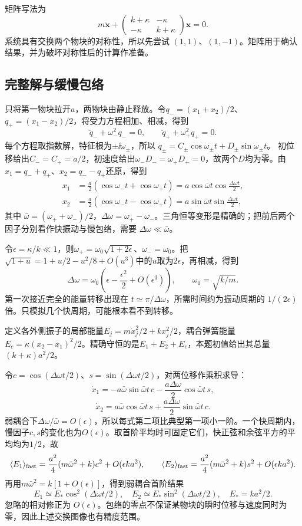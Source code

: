 \documentclass[11pt,openany,fontset=fandol]{ctexbook}
\theoremstyle{plain}\newtheorem{theorem}{定理}[chapter]\newtheorem{proposition}[theorem]{命题}
\theoremstyle{definition}\newtheorem{definition}{定义}[chapter]\newtheorem{example}{例}[chapter]
\theoremstyle{remark}\newtheorem*{remark}{说明}
\newcommand{\vct}[1]{\bm{#1}}\newcommand{\Rea}{\operatorname{Re}}\newcommand{\Ima}{\operatorname{Im}}
\begin{document}
矩阵写法为
\[
m\ddot{\vct x}+\begin{pmatrix}k+\kappa&-\kappa\\-\kappa&k+\kappa\end{pmatrix}\vct x=0.
\]
系统具有交换两个物块的对称性，所以先尝试 $(1,1)$、$(1,-1)$。矩阵用于确认结果，并为破坏对称性后的计算作准备。

\subsection{完整解与缓慢包络}
只将第一物块拉开$a$，两物块由静止释放。令$q_-=(x_1+x_2)/2$、$q_+=(x_1-x_2)/2$，将受力方程相加、相减，得到
\[\ddot q_-+\omega_-^2q_-=0,\qquad
\ddot q_++\omega_+^2q_+=0.\]
每个方程取指数解，特征根为$\pm\ii\omega_\pm$，所以
$q_\pm=C_\pm\cos\omega_\pm t+D_\pm\sin\omega_\pm t$。
初位移给出$C_-=C_+=a/2$，初速度给出$\omega_-D_-=\omega_+D_+=0$，故两个$D$均为零。由$x_1=q_-+q_+$、$x_2=q_--q_+$还原，得到
\begin{align}
x_1&=\frac a2(\cos\omega_-t+\cos\omega_+t)
=a\cos\bar\omega t\cos\frac{\Delta\omega t}{2},\\
x_2&=\frac a2(\cos\omega_-t-\cos\omega_+t)
=a\sin\bar\omega t\sin\frac{\Delta\omega t}{2},
\end{align}
其中 $\bar\omega=(\omega_++\omega_-)/2$，$\Delta\omega=\omega_+-\omega_-$。三角恒等变形是精确的；把前后两个因子分别看作快振动与慢包络，需要 $\Delta\omega\ll\bar\omega$。

令$\epsilon=\kappa/k\ll1$，则$\omega_+=\omega_0\sqrt{1+2\epsilon}$、$\omega_-=\omega_0$。把
$\sqrt{1+u}=1+u/2-u^2/8+O(u^3)$中的$u$取为$2\epsilon$，再相减，得到
\[
\Delta\omega=\omega_0\left(\epsilon-\frac{\epsilon^2}{2}+O(\epsilon^3)\right),\qquad\omega_0=\sqrt{k/m}.
\]
第一次接近完全的能量转移出现在 $t\simeq\pi/\Delta\omega$，所需时间约为振动周期的 $1/(2\epsilon)$ 倍。只模拟几个快周期，可能根本看不到转移。

定义各外侧振子的局部能量$E_j=m\dot x_j^2/2+kx_j^2/2$，耦合弹簧能量$E_c=\kappa(x_2-x_1)^2/2$。精确守恒的是$E_1+E_2+E_c$，本题初值给出其总量$(k+\kappa)a^2/2$。

令$c=\cos(\Delta\omega t/2)$、$s=\sin(\Delta\omega t/2)$，对两位移作乘积求导：
\[\dot x_1=-a\bar\omega\sin\bar\omega t\,c
-\frac{a\Delta\omega}{2}\cos\bar\omega t\,s,\]
\[\dot x_2=a\bar\omega\cos\bar\omega t\,s
+\frac{a\Delta\omega}{2}\sin\bar\omega t\,c.\]
弱耦合下$\Delta\omega/\bar\omega=O(\epsilon)$，所以每式第二项比典型第一项小一阶。一个快周期内，慢因子$c,s$的变化也为$O(\epsilon)$。取首阶平均时可固定它们，快正弦和余弦平方的平均均为$1/2$，故
\[\langle E_1\rangle_{\rm fast}
=\frac{a^2}{4}(m\bar\omega^2+k)c^2+O(\epsilon ka^2),\qquad
\langle E_2\rangle_{\rm fast}
=\frac{a^2}{4}(m\bar\omega^2+k)s^2+O(\epsilon ka^2).\]
再用$m\bar\omega^2=k[1+O(\epsilon)]$，得到弱耦合首阶结果
\[
E_1\simeq E_*\cos^2(\Delta\omega t/2),\quad
E_2\simeq E_*\sin^2(\Delta\omega t/2),\quad E_*=ka^2/2.
\]
忽略的相对修正为 $O(\epsilon)$。包络的零点不保证某物块的瞬时位移与速度同时为零，因此上述交换图像也有精度范围。
\end{document}
